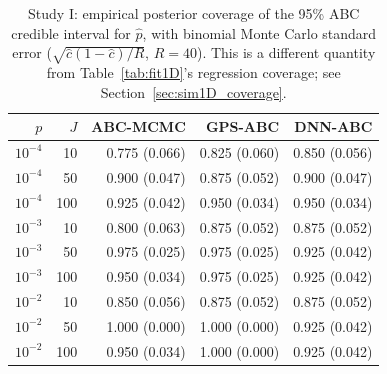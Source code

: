 \documentclass[sn-basic,iicol,pdflatex]{sn-jnl}
\begin{document}
\begin{table}[t]
\centering
\caption{Study I: empirical posterior coverage of the 95\% ABC credible
interval for $\hat p$, with binomial Monte Carlo standard error
($\sqrt{\hat c(1-\hat c)/R}$, $R=40$). This is a different quantity from
Table~\ref{tab:fit1D}'s regression coverage; see Section~\ref{sec:sim1D_coverage}.}
\label{tab:cov1D}
\begin{tabular}{rrrrr}
\toprule
$p$ & $J$ & ABC-MCMC & GPS-ABC & DNN-ABC \\
\midrule
$10^{-4}$ & 10  & 0.775 (0.066) & 0.825 (0.060) & 0.850 (0.056) \\
$10^{-4}$ & 50  & 0.900 (0.047) & 0.875 (0.052) & 0.900 (0.047) \\
$10^{-4}$ & 100 & 0.925 (0.042) & 0.950 (0.034) & 0.950 (0.034) \\
$10^{-3}$ & 10  & 0.800 (0.063) & 0.875 (0.052) & 0.875 (0.052) \\
$10^{-3}$ & 50  & 0.975 (0.025) & 0.975 (0.025) & 0.925 (0.042) \\
$10^{-3}$ & 100 & 0.950 (0.034) & 0.975 (0.025) & 0.925 (0.042) \\
$10^{-2}$ & 10  & 0.850 (0.056) & 0.875 (0.052) & 0.875 (0.052) \\
$10^{-2}$ & 50  & 1.000 (0.000) & 1.000 (0.000) & 0.925 (0.042) \\
$10^{-2}$ & 100 & 0.950 (0.034) & 1.000 (0.000) & 0.925 (0.042) \\
\bottomrule
\end{tabular}
\end{table}
\end{document}

